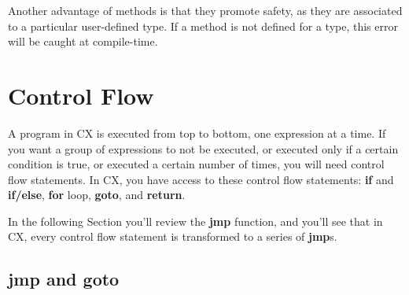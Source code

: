 \documentclass[11pt,fleqn,openany]{book} %
\begin{document}
Another advantage of methods is that they promote safety, as they are associated to a particular user-defined type. If a method is not defined for a type, this error will be caught at compile-time.



\chapter{Control Flow}
\label{chapter:control-flow}


A program in CX is executed from top to bottom, one expression at a time. If you want a group of expressions to not be executed, or executed only if a certain condition is true, or executed a certain number of times, you will need control flow statements. In CX, you have access to these control flow statements: \textbf{if} and \textbf{if/else}, \textbf{for} loop, \textbf{goto}, and \textbf{return}.

In the following Section you'll review the \textbf{jmp} function, and you'll see that in CX, every control flow statement is transformed to a series of \textbf{jmp}s.

\section{jmp and goto}
\end{document}
